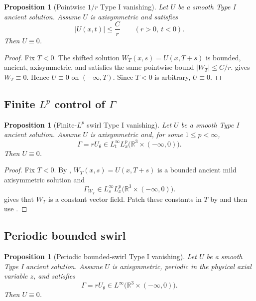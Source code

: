 \documentclass[11pt]{amsart}
\theoremstyle{plain}
\newtheorem{proposition}[theorem]{Proposition}
\theoremstyle{definition}
\theoremstyle{remark}
\numberwithin{equation}{section}
\begin{document}
\begin{proposition}[Pointwise \(1/r\) Type I vanishing]\label{prop:pointwise-typeI}
Let \(U\) be a smooth Type I ancient solution.  Assume \(U\) is axisymmetric
and satisfies
\[
   |U(x,t)|\le \frac{C}{r}
   \qquad(r>0,\ t<0).
\]
Then \(U\equiv0\).
\end{proposition}

\begin{proof}
Fix \(T<0\).  The shifted solution \(W_T(x,s)=U(x,T+s)\) is bounded, ancient,
axisymmetric, and satisfies the same pointwise bound \(|W_T|\le C/r\).
 gives \(W_T\equiv0\).  Hence \(U\equiv0\) on
\((-\infty,T)\).  Since \(T<0\) is arbitrary, \(U\equiv0\).
\end{proof}

\subsection{\texorpdfstring{Finite \(L^p\) control of \(\Gamma\)}
{Finite Lp control of Gamma}}

\begin{proposition}[Finite-\(L^p\) swirl Type I vanishing]
\label{prop:lp-swirl-typeI}
Let \(U\) be a smooth Type I ancient solution.  Assume \(U\) is axisymmetric
and, for some \(1\le p<\infty\),
\[
   \Gamma=rU_\theta\in L_t^\infty L_x^p
   \bigl(\mathbb R^3\times(-\infty,0)\bigr).
\]
Then \(U\equiv0\).
\end{proposition}

\begin{proof}
Fix \(T<0\).  By , \(W_T(x,s)=U(x,T+s)\) is a bounded
ancient mild axisymmetric solution and
\[
   \Gamma_{W_T}\in L_s^\infty L_x^p
   \bigl(\mathbb R^3\times(-\infty,0)\bigr).
\]
 gives that \(W_T\) is a constant vector field.  Patch these
constants in \(T\) by  and then use
.
\end{proof}

\subsection{Periodic bounded swirl}

\begin{proposition}[Periodic bounded-swirl Type I vanishing]
\label{prop:periodic-swirl-typeI}
Let \(U\) be a smooth Type I ancient solution.  Assume \(U\) is axisymmetric,
periodic in the physical axial variable \(z\), and satisfies
\[
   \Gamma=rU_\theta\in L^\infty
   \bigl(\mathbb R^3\times(-\infty,0)\bigr).
\]
Then \(U\equiv0\).
\end{proposition}
\end{document}
